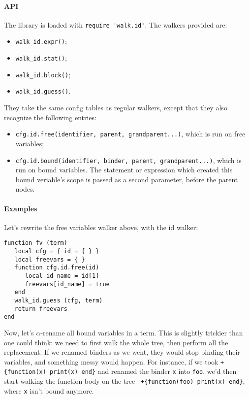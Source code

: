 \paragraph{API}
The library is loaded with \verb|require 'walk.id'|. The walkers provided are:
\begin{itemize}
\item {\tt walk\_id.expr()};
\item {\tt walk\_id.stat()};
\item {\tt walk\_id.block()};
\item {\tt walk\_id.guess()}.
\end{itemize}

They take the same config tables as regular walkers, except that they also
recognize the following entries:
\begin{itemize}
\item {\tt cfg.id.free(identifier, parent, grandparent...)}, which is run on
  free variables;
\item {\tt cfg.id.bound(identifier, binder, parent, grandparent...)}, which is
  run on bound variables. The statement or expression which created this bound
  veriable's scope is passed as a second parameter, before the parent nodes.
\end{itemize}

\paragraph{Examples}
Let's rewrite the free variables walker above, with the id walker:

\begin{verbatim}
function fv (term)
   local cfg = { id = { } }
   local freevars = { }
   function cfg.id.free(id)
      local id_name = id[1]
      freevars[id_name] = true
   end
   walk_id.guess (cfg, term)
   return freevars
end
\end{verbatim}

Now, let's $\alpha$-rename all bound variables in a term. This is slightly
trickier than one could think: we need to first walk the whole tree, then
perform all the replacement. If we renamed binders as we went, they would stop
binding their variables, and something messy would happen. For instance, if we
took {\tt +\{function(x) print(x) end\}} and renamed the binder {\tt x} into
{\tt foo}, we'd then start walking the function body on the tree {\tt
  +\{function(foo) print(x) end\}}, where {\tt x} isn't bound anymore.

